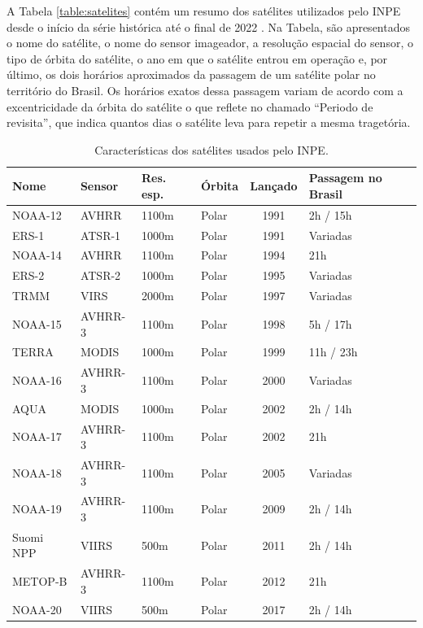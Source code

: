 \documentclass[cic,tc]{iiufrgs}
\begin{document}
A Tabela \ref{table:satelites} contém um resumo dos satélites utilizados pelo INPE desde o início da série histórica até o final de 2022 \cite{EmbrapaSatelites}. Na Tabela, são apresentados o nome do satélite, o nome do sensor imageador, a resolução espacial do sensor, o tipo de órbita do satélite, o ano em que o satélite entrou em operação e, por último, os dois horários aproximados da passagem de um satélite polar no território do Brasil. Os horários exatos dessa passagem variam de acordo com a excentricidade da órbita do satélite o que reflete no chamado ``Periodo de revisita'', que indica quantos dias o satélite leva para repetir a mesma tragetória.

\begin{table}[htbp]
\centering
\caption{Características dos satélites usados pelo INPE.}
\begin{tabular}{ @{}llllcl@{} }
  \toprule
  \textbf{Nome}    & \textbf{Sensor} & \textbf{Res. esp.} & \textbf{Órbita} & \textbf{Lançado} & \textbf{Passagem no Brasil} \\
  \midrule
  NOAA-12 & AVHRR    & 1100m       & Polar   & 1991 & 2h / 15h \\
  ERS-1   & ATSR-1   & 1000m       & Polar   & 1991 & Variadas \\
  NOAA-14 & AVHRR    & 1100m       & Polar   & 1994 & 21h \\
  ERS-2   & ATSR-2   & 1000m       & Polar   & 1995 & Variadas \\
  TRMM    & VIRS     & 2000m       & Polar   & 1997 & Variadas \\
  NOAA-15 & AVHRR-3  & 1100m       & Polar   & 1998 & 5h / 17h \\
  TERRA   & MODIS    & 1000m       & Polar   & 1999 & 11h / 23h \\
  NOAA-16 & AVHRR-3  & 1100m       & Polar   & 2000 & Variadas \\
  AQUA    & MODIS    & 1000m       & Polar   & 2002 & 2h / 14h \\
  NOAA-17 & AVHRR-3  & 1100m       & Polar   & 2002 & 21h \\
  NOAA-18 & AVHRR-3  & 1100m       & Polar   & 2005 & Variadas \\
  NOAA-19 & AVHRR-3  & 1100m       & Polar   & 2009 & 2h / 14h \\
  Suomi NPP & VIIRS  & 500m        & Polar   & 2011 & 2h / 14h \\
  METOP-B & AVHRR-3  & 1100m       & Polar   & 2012 & 21h \\
  NOAA-20 & VIIRS    & 500m        & Polar   & 2017 & 2h / 14h \\

\end{tabular}
\end{table}
\end{document}

